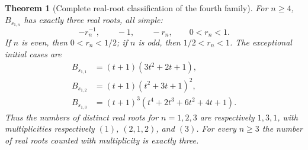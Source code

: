 \documentclass[11pt,a4paper]{article}
\newtheorem{theorem}{Theorem}[section]
\theoremstyle{definition}\newtheorem{definition}[theorem]{Definition}
\theoremstyle{remark}\newtheorem{remark}[theorem]{Remark}
\begin{document}
\begin{theorem}[Complete real-root classification of the fourth family]
\label{thm:stern-fourth-classification}
For $n\geq4$, $B_{s_{1,n}}$ has exactly three real roots, all simple:
\[
 -r_n^{-1},\qquad -1,\qquad -r_n,
 \qquad 0<r_n<1.
\]
If $n$ is even, then $0<r_n<1/2$; if $n$ is odd, then
$1/2<r_n<1$. The exceptional initial cases are
\begin{align*}
 B_{s_{1,1}}&=(t+1)(3t^2+2t+1),\\
 B_{s_{1,2}}&=(t+1)(t^2+3t+1)^2,\\
 B_{s_{1,3}}&=(t+1)^3(t^4+2t^3+6t^2+4t+1).
\end{align*}
Thus the numbers of distinct real roots for $n=1,2,3$ are respectively
$1,3,1$, with multiplicities respectively $(1)$, $(2,1,2)$, and $(3)$.
For every $n\geq3$ the number of real roots counted with multiplicity is
exactly three.
\end{theorem}
\end{document}
